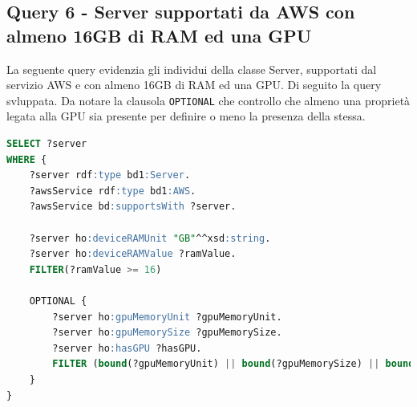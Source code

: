 \subsection{Query 6 - Server supportati da AWS con almeno 16GB di RAM ed una GPU}
La seguente query evidenzia gli individui della classe Server, supportati dal servizio AWS e con almeno 16GB di RAM ed una GPU. Di seguito la query svluppata. Da notare la clausola \texttt{OPTIONAL} che controllo che almeno una proprietà legata alla GPU sia presente per definire o meno la presenza della stessa.
\begin{lstlisting}[language=SQL]
SELECT ?server
WHERE {
    ?server rdf:type bd1:Server.
    ?awsService rdf:type bd1:AWS.
    ?awsService bd:supportsWith ?server.
    
    ?server ho:deviceRAMUnit "GB"^^xsd:string.
    ?server ho:deviceRAMValue ?ramValue.
    FILTER(?ramValue >= 16)
    
    OPTIONAL {
        ?server ho:gpuMemoryUnit ?gpuMemoryUnit.
        ?server ho:gpuMemorySize ?gpuMemorySize.
        ?server ho:hasGPU ?hasGPU.
        FILTER (bound(?gpuMemoryUnit) || bound(?gpuMemorySize) || bound(?hasGPU) )
    }
}
\end{lstlisting}